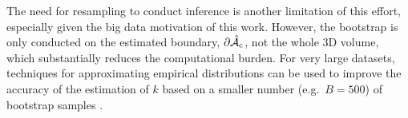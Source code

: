 The need for resampling to conduct inference is another limitation of this effort, especially given the big data motivation of this work.  However, the bootstrap  is only conducted on the estimated boundary, $\operatorname{\partial\hat{\mathcal{A}}_{c}}$, not the whole 3D volume, which substantially reduces the computational burden.  For very large datasets, techniques for approximating empirical distributions can be used to improve the accuracy of the estimation of $k$ based on a smaller number (e.g.~$B=500$) of bootstrap samples \citep{Winkler2016-mw}.
